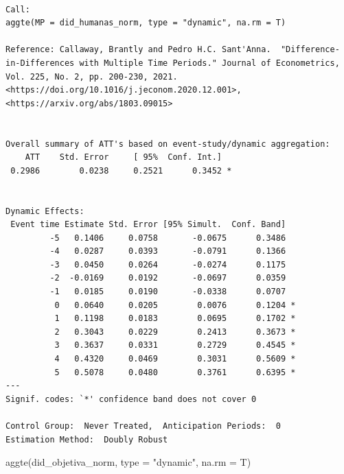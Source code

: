 \documentclass[
  letterpaper,
  DIV=11,
  numbers=noendperiod]{scrartcl}
\newenvironment{Shaded}{\begin{snugshade}}{\end{snugshade}}
\newcommand{\AttributeTok}[1]{\textcolor[rgb]{0.40,0.45,0.13}{#1}}
\newcommand{\FunctionTok}[1]{\textcolor[rgb]{0.28,0.35,0.67}{#1}}
\newcommand{\NormalTok}[1]{\textcolor[rgb]{0.00,0.23,0.31}{#1}}
\newcommand{\StringTok}[1]{\textcolor[rgb]{0.13,0.47,0.30}{#1}}
\begin{document}
\begin{verbatim}

Call:
aggte(MP = did_humanas_norm, type = "dynamic", na.rm = T)

Reference: Callaway, Brantly and Pedro H.C. Sant'Anna.  "Difference-in-Differences with Multiple Time Periods." Journal of Econometrics, Vol. 225, No. 2, pp. 200-230, 2021. <https://doi.org/10.1016/j.jeconom.2020.12.001>, <https://arxiv.org/abs/1803.09015> 


Overall summary of ATT's based on event-study/dynamic aggregation:  
    ATT    Std. Error     [ 95%  Conf. Int.]  
 0.2986        0.0238     0.2521      0.3452 *


Dynamic Effects:
 Event time Estimate Std. Error [95% Simult.  Conf. Band]  
         -5   0.1406     0.0758       -0.0675      0.3486  
         -4   0.0287     0.0393       -0.0791      0.1366  
         -3   0.0450     0.0264       -0.0274      0.1175  
         -2  -0.0169     0.0192       -0.0697      0.0359  
         -1   0.0185     0.0190       -0.0338      0.0707  
          0   0.0640     0.0205        0.0076      0.1204 *
          1   0.1198     0.0183        0.0695      0.1702 *
          2   0.3043     0.0229        0.2413      0.3673 *
          3   0.3637     0.0331        0.2729      0.4545 *
          4   0.4320     0.0469        0.3031      0.5609 *
          5   0.5078     0.0480        0.3761      0.6395 *
---
Signif. codes: `*' confidence band does not cover 0

Control Group:  Never Treated,  Anticipation Periods:  0
Estimation Method:  Doubly Robust
\end{verbatim}

\begin{Shaded}
\begin{Highlighting}[]
\FunctionTok{aggte}\NormalTok{(did\_objetiva\_norm, }\AttributeTok{type =} \StringTok{"dynamic"}\NormalTok{, }\AttributeTok{na.rm =}\NormalTok{ T)}
\end{Highlighting}
\end{Shaded}
\end{document}
